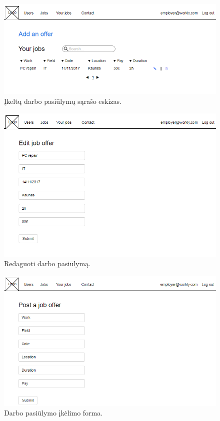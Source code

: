 \documentclass{VUMIFPSkursinis}
\begin{document}
\begin{figure}[H]
\centering
\includegraphics[width=\linewidth, frame]{img/yourJobs.png}
\caption{Įkeltų darbo pasiūlymų sąrašo eskizas.}
\end{figure}

\begin{figure}[H]
\centering
\includegraphics[width=\linewidth, frame]{img/editJob.png}
\caption{Redaguoti darbo pasiūlymą.}
\end{figure}

\begin{figure}[H]
\centering
\includegraphics[width=\linewidth, frame]{img/createJob.png}
\caption{Darbo pasiūlymo įkėlimo forma.}
\end{figure}
\end{document}
